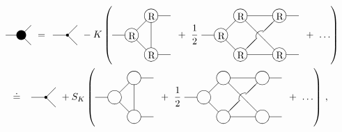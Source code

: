 \documentclass[a4paper,12pt]{article}
\begin{document}
\begin{multline}
\label{counter}
\parbox{1.2cm}{
\begin{picture}(30,60)
\put(20,30){\circle*{10}}
\put(4,30){\line(1,0){15}}
\put(20,30){\line(1,1){10}}
\put(20,30){\line(1,-1){10}}
\end{picture}
} =
\parbox{1.2cm}{
\begin{picture}(30,60)
\put(20,30){\circle*{3}}
\put(5,30){\line(1,0){15}}
\put(20,30){\line(1,1){10}}
\put(20,30){\line(1,-1){10}}
\end{picture}
} - K\left(
\parbox{2.3cm}{
\begin{picture}(60,60)
\put(20,30){\circle{14}}
\put(40,10){\circle{14}}
\put(40,50){\circle{14}}
\put(0,30){\line(1,0){13}}
\put(47,50){\line(1,0){13}}
\put(47,10){\line(1,0){13}}
\put(25,35){\line(1,1){10}}
\put(25,25){\line(1,-1){10}}
\put(40,17){\line(0,1){26.5}}
\put(16.7,26){R}
\put(36.7,6){R}
\put(36.7,46){R}
\end{picture}
} + \ \frac{1}{2} \
\parbox{3.7cm}{
\begin{picture}(100,60)
\put(20,30){\circle{14}}
\put(40,10){\circle{14}}
\put(40,50){\circle{14}}
\put(80,10){\circle{14}}
\put(80,50){\circle{14}}
\put(87,50){\line(1,0){13}}
\put(87,10){\line(1,0){13}}
\put(0,30){\line(1,0){13}}
\put(47,50){\line(1,0){26}}
\put(47,10){\line(1,0){26}}
\put(25,35){\line(1,1){10}}
\put(25,25){\line(1,-1){10}}
\put(45,15){\line(1,1){12}}
\put(75,45){\line(-1,-1){12}}
\put(45,45){\line(1,-1){30}}
\put(63.5,27){\oval(15,15)[tl]}
\put(16.7,26){R}
\put(36.7,6){R}
\put(36.7,46){R}
\put(76.7,6){R}
\put(76.7,46){R}
\end{picture}
} + \ \ldots \right) \\
\doteq \
\parbox{1.2cm}{
\begin{picture}(30,60)
\put(20,30){\circle*{3}}
\put(5,30){\line(1,0){15}}
\put(20,30){\line(1,1){10}}
\put(20,30){\line(1,-1){10}}
\end{picture}
} + S_K\left(
\parbox{2.3cm}{
\begin{picture}(60,60)
\put(20,30){\circle{14}}
\put(40,10){\circle{14}}
\put(40,50){\circle{14}}
\put(0,30){\line(1,0){13}}
\put(47,50){\line(1,0){13}}
\put(47,10){\line(1,0){13}}
\put(25,35){\line(1,1){10}}
\put(25,25){\line(1,-1){10}}
\put(40,17){\line(0,1){26.5}}
\end{picture}
} + \ \frac{1}{2} \
\parbox{3.7cm}{
\begin{picture}(100,60)
\put(20,30){\circle{14}}
\put(40,10){\circle{14}}
\put(40,50){\circle{14}}
\put(80,10){\circle{14}}
\put(80,50){\circle{14}}
\put(87,50){\line(1,0){13}}
\put(87,10){\line(1,0){13}}
\put(0,30){\line(1,0){13}}
\put(47,50){\line(1,0){26}}
\put(47,10){\line(1,0){26}}
\put(25,35){\line(1,1){10}}
\put(25,25){\line(1,-1){10}}
\put(45,15){\line(1,1){12}}
\put(75,45){\line(-1,-1){12}}
\put(45,45){\line(1,-1){30}}
\put(63.5,27){\oval(15,15)[tl]}
\end{picture}
} + \ \ldots \right)\,,
\end{multline}
\end{document}
